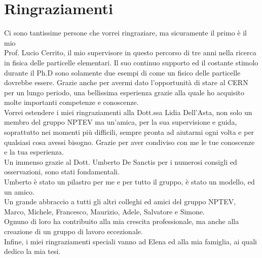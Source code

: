 


\chapter*{Ringraziamenti}

Ci sono tantissime persone che vorrei ringraziare, ma 
sicuramente il primo è il mio \\Prof. Lucio Cerrito, il mio supervisore in questo 
percorso di tre anni nella ricerca in fisica delle particelle elementari.
Il suo continuo supporto ed il costante stimolo durante il Ph.D sono solamente due 
esempi di come un fisico delle particelle dovrebbe essere.
Grazie anche per avermi dato l'opportunità di stare al CERN per un lungo periodo, una bellissima esperienza grazie alla quale ho acquisito molte importanti competenze e conoscenze.\\

\noindent Vorrei estendere i miei ringraziamenti alla Dott.ssa Lidia Dell'Asta, non solo
un membro del gruppo NPTEV ma un'amica, per la
sua supervisione e guida, soprattutto nei momenti più difficili, sempre pronta ad aiutarmi ogni volta e per qualsiasi cosa avessi bisogno. Grazie per aver condiviso con me le tue conoscenze e la tua esperienza.\\

\noindent Un immenso grazie al Dott. Umberto De Sanctis per i numerosi
consigli ed osservazioni, sono stati fondamentali.\\
Umberto è stato un pilastro per me e per tutto il gruppo, è stato un modello, ed un amico.\\

\noindent Un grande abbraccio a tutti gli altri colleghi ed amici del gruppo NPTEV, Marco, Michele, 
Francesco, Maurizio, Adele, Salvatore e Simone. \\
Ognuno di loro ha contribuito alla mia crescita professionale, ma
anche alla creazione di un gruppo di lavoro eccezionale.\\  

\noindent Infine, i miei ringraziamenti speciali vanno ad Elena ed alla mia famiglia, ai quali
dedico la mia tesi.

\setcounter{page}{1}




